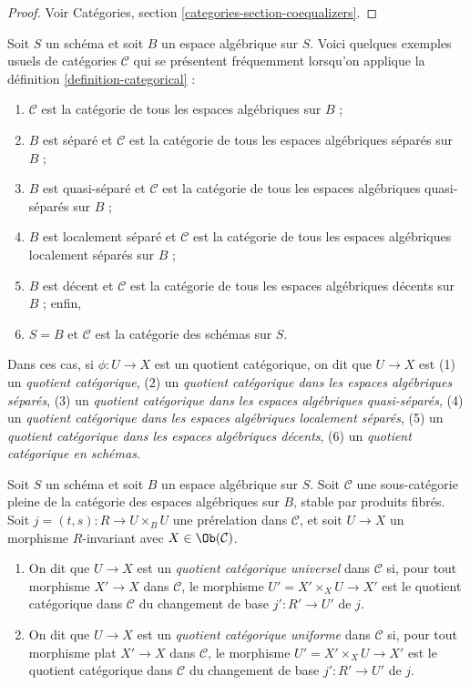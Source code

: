 \begin{proof}
Voir Catégories, section \ref{categories-section-coequalizers}.
\end{proof}

\begin{example}
\label{example-categories}
Soit $S$ un schéma et soit $B$ un espace algébrique sur $S$.
Voici quelques exemples usuels de catégories $\mathcal{C}$
qui se présentent fréquemment lorsqu'on applique la
définition \ref{definition-categorical} :
\begin{enumerate}
\item $\mathcal{C}$ est la catégorie de tous les espaces algébriques sur $B$ ;
\item $B$ est séparé et $\mathcal{C}$ est la catégorie de tous les espaces
algébriques séparés sur $B$ ;
\item $B$ est quasi-séparé et $\mathcal{C}$ est la catégorie de tous les espaces
algébriques quasi-séparés sur $B$ ;
\item $B$ est localement séparé et $\mathcal{C}$ est la catégorie de tous les espaces
algébriques localement séparés sur $B$ ;
\item $B$ est décent et $\mathcal{C}$ est la catégorie de tous les espaces algébriques
décents sur $B$ ; enfin,
\item $S = B$ et $\mathcal{C}$ est la catégorie des schémas sur $S$.
\end{enumerate}
Dans ces cas, si $\phi : U \to X$ est un quotient catégorique, on dit que
$U \to X$ est
(1) un {\it quotient catégorique},
(2) un {\it quotient catégorique dans les espaces algébriques séparés},
(3) un {\it quotient catégorique dans les espaces algébriques quasi-séparés},
(4) un {\it quotient catégorique dans les espaces algébriques localement séparés},
(5) un {\it quotient catégorique dans les espaces algébriques décents},
(6) un {\it quotient catégorique en schémas}.
\end{example}

\begin{definition}
\label{definition-universal-categorical}
Soit $S$ un schéma et soit $B$ un espace algébrique sur $S$.
Soit $\mathcal{C}$ une sous-catégorie pleine de la catégorie des espaces
algébriques sur $B$, stable par produits fibrés.
Soit $j = (t, s) : R \to U \times_B U$ une prérelation dans
$\mathcal{C}$, et soit $U \to X$ un morphisme $R$-invariant avec
$X \in \Ob(\mathcal{C})$.
\begin{enumerate}
\item On dit que $U \to X$ est un {\it quotient catégorique universel}
dans $\mathcal{C}$ si, pour tout morphisme $X' \to X$ dans $\mathcal{C}$,
le morphisme $U' = X' \times_X U \to X'$ est le quotient catégorique dans
$\mathcal{C}$ du changement de base $j' : R' \to U'$ de $j$.
\item On dit que $U \to X$ est un {\it quotient catégorique uniforme}
dans $\mathcal{C}$ si, pour tout morphisme plat $X' \to X$ dans $\mathcal{C}$,
le morphisme $U' = X' \times_X U \to X'$ est le quotient catégorique dans
$\mathcal{C}$ du changement de base $j' : R' \to U'$ de $j$.
\end{enumerate}
\end{definition}


